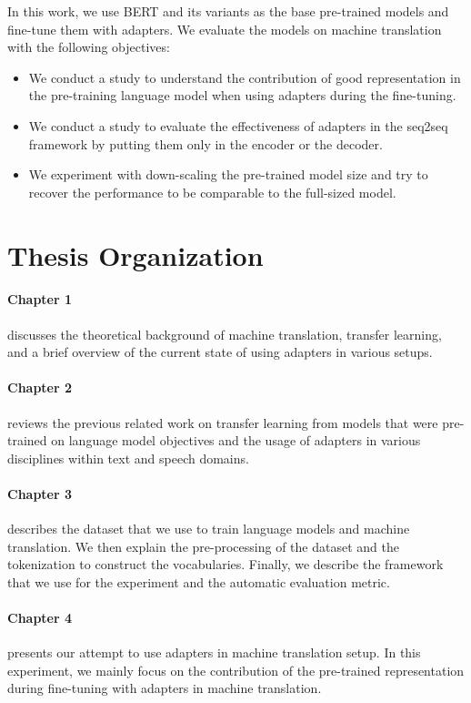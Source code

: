 In this work, we use BERT and its variants as the base pre-trained models and fine-tune them with adapters. We evaluate the models on machine translation with the following objectives:
\begin{itemize}
    \item We conduct a study to understand the contribution of good representation in the pre-training language model when using adapters during the fine-tuning.
    \item We conduct a study to evaluate the effectiveness of adapters in the seq2seq framework by putting them only in the encoder or the decoder.
    \item We experiment with down-scaling the pre-trained model size and try to recover the performance to be comparable to the full-sized model.
\end{itemize}

\section*{Thesis Organization}

\paragraph{Chapter 1} discusses the theoretical background of machine translation, transfer learning, and a brief overview of the current state of using adapters in various setups.

\paragraph{Chapter 2} reviews the previous related work on transfer learning from models that were pre-trained on language model objectives and the usage of adapters in various disciplines within text and speech domains.

\paragraph{Chapter 3} describes the dataset that we use to train language models and machine translation. We then explain the pre-processing of the dataset and the tokenization to construct the vocabularies. Finally, we describe the framework that we use for the experiment and the automatic evaluation metric.

\paragraph{Chapter 4} presents our attempt to use adapters in machine translation setup. In this experiment, we mainly focus on the contribution of the pre-trained representation during fine-tuning with adapters in machine translation.

